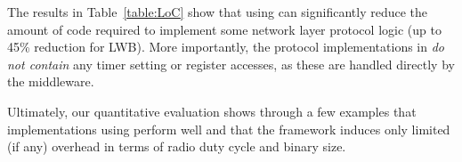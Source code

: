 The results in Table~\ref{table:LoC} show that using \baloo can significantly reduce the amount of code required to implement some network layer protocol logic (up to 45\% reduction for LWB).
More importantly, the protocol implementations in \baloo \textsl{do not contain} any timer setting or register accesses, as these are handled directly by the middleware.

Ultimately, our quantitative evaluation shows through a few examples that implementations using \baloo perform well and that the framework induces only limited (if any) overhead in terms of radio duty cycle and binary size.
